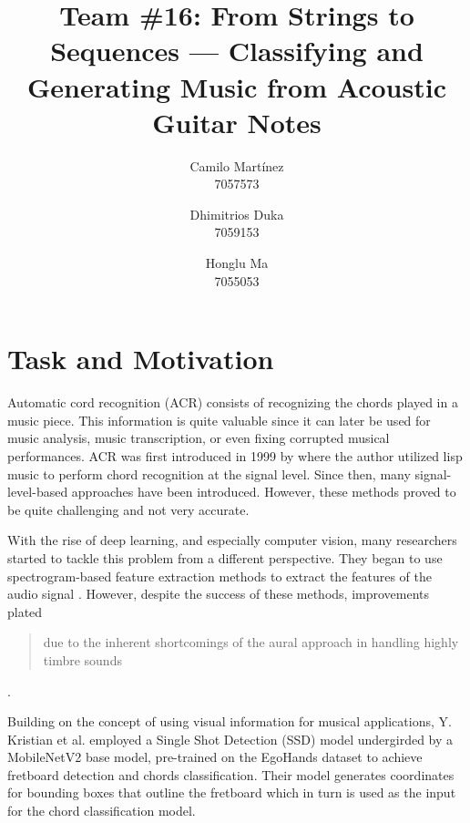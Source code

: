 \documentclass[10pt,twocolumn,letterpaper]{article}
\begin{document}
\title{Team \#16: From Strings to Sequences --- Classifying and Generating Music from Acoustic Guitar Notes}

\author{
    Camilo Martínez\\
    7057573\\
    \and
    Dhimitrios Duka\\
    7059153\\
    \and
    Honglu Ma\\
    7055053\\
}
\maketitle

\section{Task and Motivation}
Automatic cord recognition (ACR) consists of recognizing the chords played in a music piece. This information is quite valuable since it can later be used for music analysis, music transcription, or even fixing corrupted musical performances. ACR was first introduced in 1999 by \cite{takuya1999realtime} where the author utilized lisp music to perform chord recognition at the signal level. Since then, many signal-level-based approaches have been introduced. However, these methods proved to be quite challenging and not very accurate.

With the rise of deep learning, and especially computer vision, many researchers started to tackle this problem from a different perspective. They began to use spectrogram-based feature extraction methods to extract the features of the audio signal \cite{boulanger2013audio, korzeniowski2016feature, stark2009real}. However, despite the success of these methods, improvements plated \blockquote{due to the inherent shortcomings of the aural approach in handling highly timbre sounds} \cite{du2023conditional}.


Building on the concept of using visual information for musical applications, Y. Kristian et al. \cite{Kristian_Zaman_Tenoyo_Jodhinata_2024} employed a Single Shot Detection (SSD) model undergirded by a MobileNetV2 base model, pre-trained on the EgoHands dataset to achieve fretboard detection and chords classification. Their model generates coordinates for bounding boxes that outline the fretboard which in turn is used as the input for the chord classification model.
\end{document}
